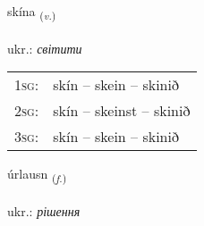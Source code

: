 \documentclass[frontgrid, backgrid]{flacards}\usepackage[]{graphicx}\usepackage[]{xcolor}
\begin{document}
\renewcommand{\flhead}{\vskip5pt \fboxsep=0pt {\small\bfseries\footnotesize Sagnorð | дієслово}}
\renewcommand{\fcfoot}{\vskip5pt \fboxsep=0pt \hspace{2pt}{\small\bfseries\footnotesize 3K}}

\renewcommand{\blhead}{\vskip5pt {\small\bfseries\footnotesize Sagnorð | дієслово }}
\renewcommand{\bcfoot}{\vskip5pt \hspace{2pt}{\small\bfseries\footnotesize 3K}}


{skína \small{\textsubscript{(\textit{v.})}} \\[1ex] %
\textphonetic{[sciːna]} \\
ukr.: \emph{світити} \\  [2ex]
\renewcommand*{\arraystretch}{0.8}
\begin{tabular}{p{1cm}l}
\textsc{1sg}: & skín -- skein -- skinið \\ 
\textsc{2sg}: & skín -- skeinst -- skinið \\ 
\textsc{3sg}: & skín -- skein -- skinið \\ 
\end{tabular}
}

\renewcommand{\flhead}{\vskip5pt \fboxsep=0pt {\small\bfseries\footnotesize Nafnorð | іменник}}
\renewcommand{\fcfoot}{\vskip5pt \fboxsep=0pt \hspace{2pt}{\small\bfseries\footnotesize 3K}}

\renewcommand{\blhead}{\vskip5pt {\small\bfseries\footnotesize Nafnorð | іменник }}
\renewcommand{\bcfoot}{\vskip5pt \hspace{2pt}{\small\bfseries\footnotesize 3K}}


{úrlausn \small{\textsubscript{(\textit{f.})}} \\[1ex] %
\textphonetic{[urlœistn̥]} \\
ukr.: \emph{рішення} \\  [2ex]
\renewcommand*{\arraystretch}{0.8}
}
\end{document}
